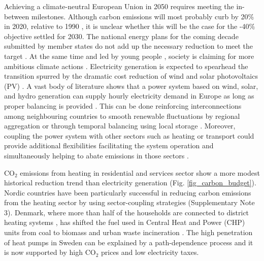 \documentclass[5p]{elsarticle} %
\begin{document}
Achieving a climate-neutral European Union in 2050 \cite{in-depth_2018} requires meeting the in-between milestones. Although carbon emissions will most probably curb by 20\% in 2020, relative to 1990 \cite{EEA_totalGHG}, it is unclear whether this will be the case for the -40\% objective settled for 2030. The national energy plans for the coming decade submitted by member states do not add up the necessary reduction to meet the target \cite{EU-appraisal_2019}. At the same time and led by young people \cite{Warren_2019}, society is claiming for more ambitious climate actions \cite{Rinscheid_2019}. Electricity generation is expected to spearhead the transition spurred by the dramatic cost reduction of wind \cite{Lantz_2012} and solar photovoltaics (PV) \cite{Creutzig_2017, Haegel_2019}. A vast body of literature shows that a power system based on wind, solar, and hydro generation can supply hourly electricity demand in Europe as long as proper balancing is provided 
\cite{Eriksen_2017, Schlachtberger_2017, Gils_2017a, Brown_response}. This can be done reinforcing interconnections among neighbouring countries \cite{Rodriguez_2014} to smooth renewable fluctuations by regional aggregation or through temporal balancing using local storage \cite{Rasmussen_2012, Cebulla_2017}. Moreover, coupling the power system with other sectors such as heating or transport could provide additional flexibilities facilitating the system operation and simultaneously helping to abate emissions in those sectors \cite{Connolly_2016, Brown_2018, Child_2019}. 

CO$_2$ emissions from heating in residential and services sector show a more modest historical reduction trend than electricity generation (Fig. \ref{fig_carbon_budget}). Nordic countries have been particularly successful in reducing carbon emissions from the heating sector by using sector-coupling strategies (Supplementary Note 3). Denmark, where more than half of the households are connected to district heating systems \cite{Gross_2019}, has shifted the fuel used in Central Heat and Power (CHP) units from coal to biomass and urban waste incineration \cite{DEA_2015}. The high penetration of heat pumps in Sweden can be explained by a path-dependence process \cite{Gross_2019} and it is now supported by high CO$_2$ prices \cite{Carbon_pricing_2019} and low electricity taxes. 
\end{document}
